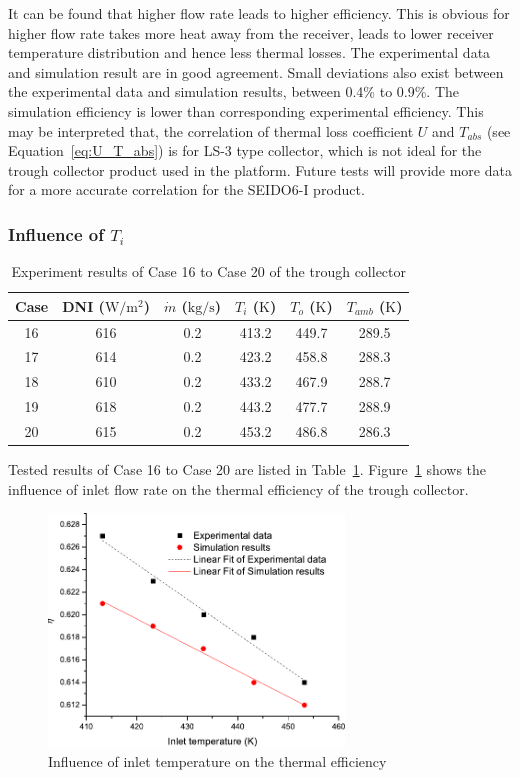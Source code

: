 It can be found that higher flow rate leads to higher efficiency. This is obvious for higher flow rate takes more heat away from the receiver, leads to lower receiver temperature distribution and hence less thermal losses. The experimental data and simulation result are in good agreement. Small deviations also exist between the experimental data and simulation results, between 0.4\% to 0.9\%. The simulation efficiency is lower than corresponding experimental efficiency. This may be interpreted that, the correlation of thermal loss coefficient $U$ and $T_{abs}$ (see Equation~\ref{eq:U_T_abs}) is for LS-3 type collector, which is not ideal for the trough collector product used in the platform. Future tests will provide more data for a more accurate correlation for the SEIDO6-I product.

\subsubsection{Influence of $T_i$}

\begin{table}[htbp]\footnotesize
	\caption{Experiment results of Case 16 to Case 20 of the trough collector}
	\begin{center}
	\begin{tabular}{cccccc}
		\toprule
		Case	& DNI ($\mathrm{W/m^2}$)	&	$\dot{m}$ ($\mathrm{kg/s}$)			&	$T_i$ ($\mathrm{K}$)	&	$T_o$ ($\mathrm{K}$)		&	$T_{amb}$ ($\mathrm{K}$)\\
		\midrule
		16	&	616	&	0.2	&	413.2	&	449.7	&	289.5\\
		17	&	614	&	0.2	&	423.2	&	458.8	&	288.3\\
		18	&	610	&	0.2	&	433.2	&	467.9	&	288.7	\\
		19	&	618	&	0.2	&	443.2	&	477.7	&	288.9\\
		20	&	615	&	0.2	&	453.2	&	486.8	&	286.3\\
		\bottomrule
	\end{tabular}
	\end{center}
	\label{tab:ResultOfDish3}
\end{table}
Tested results of Case 16 to Case 20 are listed in Table~\ref{tab:ResultOfDish3}.
Figure~\ref{fig:T_i-eta-trough} shows the influence of inlet flow rate on the thermal efficiency of the trough collector.
\begin{figure}[!ht]
\centering
\includegraphics[width=0.7\textwidth]{fig/T_i-eta-trough}
\caption{Influence of inlet temperature on the thermal efficiency}
\label{fig:T_i-eta-trough}
\end{figure}


